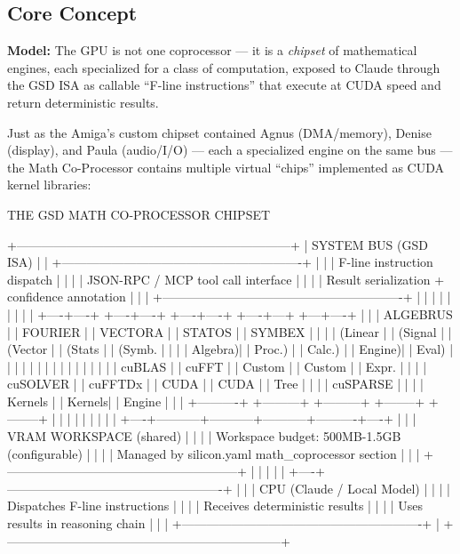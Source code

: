 \documentclass[11pt,letterpaper]{article}
\begin{document}
\subsection{Core Concept}

\begin{quotebox}
\textbf{Model:} The GPU is not one coprocessor --- it is a \textit{chipset} of mathematical engines, each specialized for a class of computation, exposed to Claude through the GSD ISA as callable ``F-line instructions'' that execute at CUDA speed and return deterministic results.
\end{quotebox}

Just as the Amiga's custom chipset contained Agnus (DMA/memory), Denise (display), and Paula (audio/I/O) --- each a specialized engine on the same bus --- the Math Co-Processor contains multiple virtual ``chips'' implemented as CUDA kernel libraries:

\begin{asciibox}
THE GSD MATH CO-PROCESSOR CHIPSET

  +------------------------------------------------------------------+
  |                     SYSTEM BUS (GSD ISA)                         |
  |   +----------------------------------------------------------+  |
  |   |  F-line instruction dispatch                              |  |
  |   |  JSON-RPC / MCP tool call interface                       |  |
  |   |  Result serialization + confidence annotation             |  |
  |   +----------------------------------------------------------+  |
  |        |           |           |           |          |          |
  |   +----+----+ +----+----+ +----+----+ +----+---+ +---+----+    |
  |   | ALGEBRUS | | FOURIER | | VECTORA | | STATOS | | SYMBEX |   |
  |   | (Linear  | | (Signal | | (Vector | | (Stats | | (Symb. |   |
  |   |  Algebra)| |  Proc.) | |  Calc.) | | Engine)| |  Eval) |   |
  |   |          | |         | |         | |        | |        |    |
  |   | cuBLAS   | | cuFFT   | | Custom  | | Custom | | Expr.  |   |
  |   | cuSOLVER | | cuFFTDx | | CUDA    | | CUDA   | | Tree   |   |
  |   | cuSPARSE | |         | | Kernels | | Kernels| | Engine |   |
  |   +----------+ +---------+ +---------+ +--------+ +--------+   |
  |        |           |           |           |          |          |
  |   +----+-----------+-----------+-----------+----------+----+    |
  |   |              VRAM WORKSPACE (shared)                   |    |
  |   |   Workspace budget: 500MB-1.5GB (configurable)         |    |
  |   |   Managed by silicon.yaml math_coprocessor section      |    |
  |   +--------------------------------------------------------+   |
  |        |                                                        |
  |   +----+----------------------------------------------------+   |
  |   |              CPU (Claude / Local Model)                  |  |
  |   |   Dispatches F-line instructions                         |  |
  |   |   Receives deterministic results                         |  |
  |   |   Uses results in reasoning chain                        |  |
  |   +----------------------------------------------------------+  |
  +------------------------------------------------------------------+
\end{asciibox}
\end{document}
